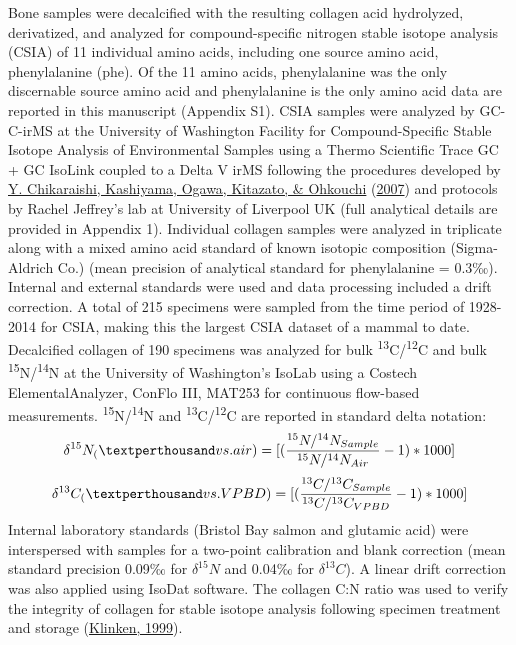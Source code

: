 \documentclass [11pt, proquest] {uwthesis}[2015/03/03]
\begin{document}
Bone samples were decalcified with the resulting collagen acid hydrolyzed, derivatized, and analyzed for compound-specific nitrogen stable isotope analysis (CSIA) of 11 individual amino acids, including one source amino acid, phenylalanine (phe). Of the 11 amino acids, phenylalanine was the only discernable source amino acid and phenylalanine is the only amino acid data are reported in this manuscript (Appendix S1). CSIA samples were analyzed by GC-C-irMS at the University of Washington Facility for Compound-Specific Stable Isotope Analysis of Environmental Samples using a Thermo Scientific Trace GC + GC IsoLink coupled to a Delta V irMS following the procedures developed by \protect\hyperlink{ref-Chikaraishi2007}{Y. Chikaraishi, Kashiyama, Ogawa, Kitazato, \& Ohkouchi} (\protect\hyperlink{ref-Chikaraishi2007}{2007}) and protocols by Rachel Jeffrey's lab at University of Liverpool UK (full analytical details are provided in Appendix 1). Individual collagen samples were analyzed in triplicate along with a mixed amino acid standard of known isotopic composition (Sigma-Aldrich Co.) (mean precision of analytical standard for phenylalanine = 0.3‰). Internal and external standards were used and data processing included a drift correction. A total of 215 specimens were sampled from the time period of 1928-2014 for CSIA, making this the largest CSIA dataset of a mammal to date. Decalcified collagen of 190 specimens was analyzed for bulk \textsuperscript{13}C/\textsuperscript{12}C and bulk \textsuperscript{15}N/\textsuperscript{14}N at the University of Washington's IsoLab using a Costech ElementalAnalyzer, ConFlo III, MAT253 for continuous flow-based measurements. \textsuperscript{15}N/\textsuperscript{14}N and \textsuperscript{13}C/\textsuperscript{12}C are reported in standard delta notation:
\begin{equation} 
  \delta^{15}N_ ( \textperthousand vs. air) =   
  [(\frac{^{15}N/^{14}N_{Sample}}{^{15}N/^{14}N_{Air}} -1)*1000]
  \label{eq:deltN}
\end{equation}
\begin{equation} 
  \delta^{13}C_ ( \textperthousand vs. VPBD) =   
  [(\frac{^{13}C/^{13}C_{Sample}}{^{13}C/^{13}C_{VPBD}} -1)*1000]
  \label{eq:deltC}
\end{equation}
Internal laboratory standards (Bristol Bay salmon and glutamic acid) were interspersed with samples for a two-point calibration and blank correction (mean standard precision 0.09‰ for \(\delta^{15}N\) and 0.04‰ for \(\delta^{13}C\)). A linear drift correction was also applied using IsoDat software. The collagen C:N ratio was used to verify the integrity of collagen for stable isotope analysis following specimen treatment and storage (\protect\hyperlink{ref-vanKlinken1999}{Klinken, 1999}).
\end{document}
